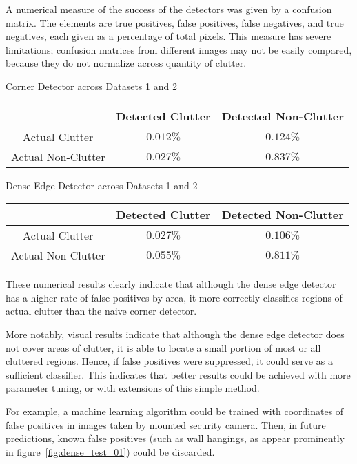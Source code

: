 \documentclass[11pt]{article}
\begin{document}
A numerical measure of the success of the detectors was given by a confusion
matrix. The elements are true positives, false positives, false negatives, and
true negatives, each given as a percentage of total pixels. This measure has
severe limitations; confusion matrices from different images may not be easily
compared, because they do not normalize across quantity of clutter.

\begin{center}
    {\large Corner Detector across Datasets 1 and 2} \\[1em]
\begin{tabular}{c|cc}
    & Detected Clutter & Detected Non-Clutter \\
    \hline
    Actual Clutter     & $0.012\%$ & $0.124\%$ \\
    Actual Non-Clutter & $0.027\%$ & $0.837\%$
\end{tabular}
\end{center}
\hfill

\begin{center}
    {\large Dense Edge Detector across Datasets 1 and 2} \\[1em]
\begin{tabular}{c|cc}
    & Detected Clutter & Detected Non-Clutter \\
    \hline
    Actual Clutter     & $0.027\%$ & $0.106\%$ \\
    Actual Non-Clutter & $0.055\%$ & $0.811\%$
\end{tabular}
\end{center}

These numerical results clearly indicate that although the dense edge detector
has a higher rate of false positives by area, it more correctly classifies regions of
actual clutter than the naive corner detector. 

More notably, visual results indicate that although the dense edge detector does
not cover areas of clutter, it is able to locate a small portion of most or all
cluttered regions. Hence, if false positives were suppressed, it could serve as
a sufficient classifier. This indicates that better results could be achieved
with more parameter tuning, or with extensions of this simple method.

For example, a machine learning algorithm could be trained with coordinates of
false positives in images taken by mounted security camera. Then, in future
predictions, known false positives (such as wall hangings, as appear prominently
in figure~\ref{fig:dense_test_01}) could be discarded.
\end{document}
